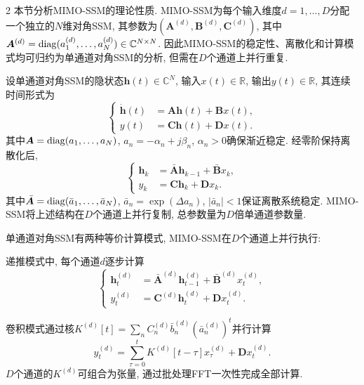 \begin{multicols}{2}
本节分析MIMO-SSM的理论性质.
MIMO-SSM为每个输入维度$d=1,\ldots,D$分配一个独立的$N$维对角SSM,
其参数为$({\bm A}^{(d)}, {\bm B}^{(d)}, {\bm C}^{(d)})$,
其中${\bm A}^{(d)} = {\rm diag}(a_1^{(d)}, \ldots, a_N^{(d)}) \in \mathbb{C}^{N \times N}$.
因此MIMO-SSM的稳定性、离散化和计算模式均可归约为单通道对角SSM的分析,
但需在$D$个通道上并行重复.

设单通道对角SSM的隐状态${\bm h}(t) \in \mathbb{C}^N$,
输入$x(t) \in \mathbb{R}$, 输出$y(t) \in \mathbb{R}$, 其连续时间形式为
\begin{equation}
\left\{\begin{aligned}
\dot{{\bm h}}(t) &= {\bm A}{\bm h}(t) + {\bm B}x(t), \\
y(t) &= {\bm C}{\bm h}(t) + {\bm D}x(t).
\end{aligned}\right.
\end{equation}
其中${\bm A} = {\rm diag}(a_1, \ldots, a_N)$,
$a_n = -\alpha_n + j\beta_n$, $\alpha_n > 0$确保渐近稳定.
经零阶保持离散化后,
\begin{equation}
\left\{\begin{aligned}
{\bm h}_k &= \bar{{\bm A}}{\bm h}_{k-1} + \bar{{\bm B}}x_k, \\
y_k &= {\bm C}{\bm h}_k + {\bm D}x_k.
\end{aligned}\right.
\end{equation}
其中$\bar{{\bm A}} = {\rm diag}(\bar{a}_1, \ldots, \bar{a}_N)$,
$\bar{a}_n = \exp(\Delta a_n)$, $|\bar{a}_n| < 1$保证离散系统稳定.
MIMO-SSM将上述结构在$D$个通道上并行复制, 总参数量为$D$倍单通道参数量.

\begin{Def}
\label{def:ssm_modes}
单通道对角SSM有两种等价计算模式, MIMO-SSM在$D$个通道上并行执行:

递推模式中, 每个通道$d$逐步计算
\begin{equation}
\label{eq:recurrent}
\left\{\begin{aligned}
{\bm h}_t^{(d)} &= \bar{{\bm A}}^{(d)}{\bm h}_{t-1}^{(d)} + \bar{{\bm B}}^{(d)}x_t^{(d)}, \\
y_t^{(d)} &= {\bm C}^{(d)}{\bm h}_t^{(d)} + {\bm D}x_t^{(d)}.
\end{aligned}\right.
\end{equation}

卷积模式通过核$K^{(d)}[t] = \sum_n C_n^{(d)}\bar{b}_n^{(d)}(\bar{a}_n^{(d)})^t$并行计算
\begin{equation}
\label{eq:convolution}
y_t^{(d)} = \sum_{\tau=0}^{t} K^{(d)}[t{-}\tau] x_\tau^{(d)} + {\bm D}x_t^{(d)}.
\end{equation}
$D$个通道的$K^{(d)}$可组合为张量, 通过批处理FFT一次性完成全部计算.
\end{Def}


\end{multicols}
